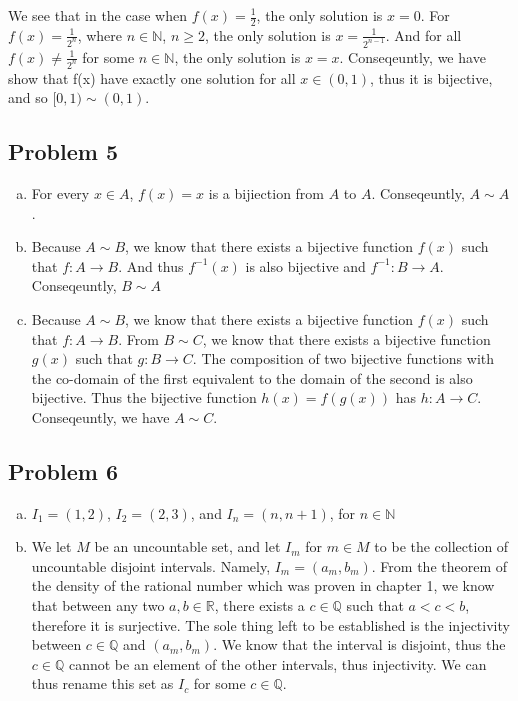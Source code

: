 \documentclass[12pt]{article}
\begin{document}
\begin{enumerate}[a).]
{        We see that in the case when $f(x) = \frac{1}{2}$, the only solution is $x = 0$.
        For $f(x) = \frac{1}{2^n}$, where $n \in \mathbb{N}$, $n \ge 2$, the only solution is $x = \frac{1}{2^{n-1}}$. 
        And for all $ f(x) \ne \frac{1}{2^n}$ for some $n \in \mathbb{N}$, the only solution is $x = x$. 
        Conseqeuntly, we have show that f(x) have exactly one solution for all $x \in (0,1)$, thus it is bijective, and so $[0,1) \sim (0,1)$. 
    }

\end{enumerate}


\subsection*{Problem 5}
\begin{enumerate}[a).]
    \item {
        For every $x \in A$, $f(x) = x$ is a bijiection from $A$ to $A$. 
        Conseqeuntly, $A \sim A$. 
    }
    \item {
        Because $A \sim B$, we know that there exists a bijective function $f(x)$ such that $f: A \rightarrow B$. 
        And thus $f^{-1}(x)$ is also bijective and $f^{-1}: B \rightarrow A$. 
        Conseqeuntly, $B \sim A$
    }
    \item {
        Because $A \sim B$, we know that there exists a bijective function $f(x)$ such that $f: A \rightarrow B$. 
        From $B \sim C$, we know that there exists a bijective function $g(x)$ such that $g: B \rightarrow C$. 
        The composition of two bijective functions with the co-domain of the first equivalent to the domain of the second is also bijective. 
        Thus the bijective function $h(x) = f(g(x))$ has $h: A \rightarrow C$. Conseqeuntly, we have $A \sim C$. 

    }
\end{enumerate}


\subsection*{Problem 6}
\begin{enumerate}[a).]
    \item {
    $I_1 = (1, 2)$,
    $I_2 = (2, 3)$,
    and $I_n = (n, n+1)$, for $n \in \mathbb{N}$

    }
    \item {
        We let $M$ be an uncountable set, and let $I_m$ for $m \in M$ to be the collection of uncountable disjoint intervals.
        Namely, $I_m = (a_m, b_m)$. From the theorem of the density of the rational number which was proven in chapter 1, we know that between any two $a,b \in \mathbb{R}$, there exists a $c \in \mathbb{Q}$ such that $a < c < b$, therefore it is surjective.
        The sole thing left to be established is the injectivity between $c \in \mathbb{Q}$ and $(a_m, b_m)$. 
        We know that the interval is disjoint, thus the $c \in \mathbb{Q}$ cannot be an element of the other intervals, thus injectivity.
        We can thus rename this set as $I_c$ for some $c \in \mathbb{Q}$. 

    }
\end{enumerate}
\end{document}
